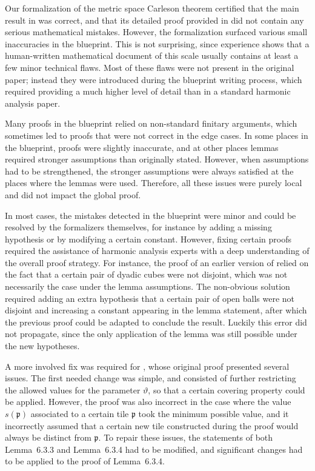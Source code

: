 \documentclass[12pt, reqno]{amsart}
\theoremstyle{definition}
\theoremstyle{plain}
\begin{document}
Our formalization of the metric space Carleson theorem certified that the main result in \cite{ThieleCarlesonPreprint} was correct, and that its detailed proof provided in \cite{CarlesonBlueprint} did not contain any serious mathematical mistakes. However, the formalization surfaced various small inaccuracies in the blueprint.  This is not surprising, since experience shows that a human-written mathematical document of this scale usually contains at least a few minor technical flaws.
Most of these flaws were not present in the original paper; instead they were introduced during the blueprint writing process, which required providing a much higher level of detail than in a standard harmonic analysis paper.

Many proofs in the blueprint relied on non-standard finitary arguments, which sometimes led to proofs that were not correct in the edge cases.
In some places in the blueprint, proofs were slightly inaccurate, and at other places lemmas required stronger assumptions than originally stated. However, when assumptions had to be strengthened, the
stronger assumptions were always satisfied at the places where the lemmas
were used. Therefore, all these issues were purely local and did not impact the global proof.


In most cases, the mistakes detected in the blueprint were minor and could be resolved by the formalizers themselves, for instance by adding a missing hypothesis or by modifying a certain constant. However, fixing certain proofs required the assistance of harmonic analysis experts with a deep understanding of the overall proof strategy. For instance, the proof of an earlier version of \cite[Lemma~6.2.3]{CarlesonBlueprint} relied on the fact that a certain pair of dyadic cubes were not disjoint, which was not necessarily the case under the lemma assumptions. The non-obvious solution required adding an extra hypothesis that a certain pair of open balls were not disjoint and increasing a constant appearing in the lemma statement, after which the previous proof could be adapted to conclude the result. Luckily this error did not propagate, since the only application of the lemma was still possible under the new hypotheses.

A more involved fix was required for \cite[Lemma~6.3.4]{CarlesonBlueprint}, whose original proof presented several issues. The first needed change was simple, and consisted of further restricting the allowed values for the parameter $\vartheta$, so that a certain covering property could be applied. However, the proof was also incorrect in the case where the value $s(\mathfrak{p})$ associated to a certain tile $\mathfrak{p}$ took the minimum possible value, and it incorrectly assumed that a certain new tile constructed during the proof would always be distinct from $\mathfrak{p}$. To repair these issues, the statements of both Lemma~6.3.3 and Lemma~6.3.4 had to be modified, and significant changes had to be applied to the proof of Lemma~6.3.4.
\end{document}
